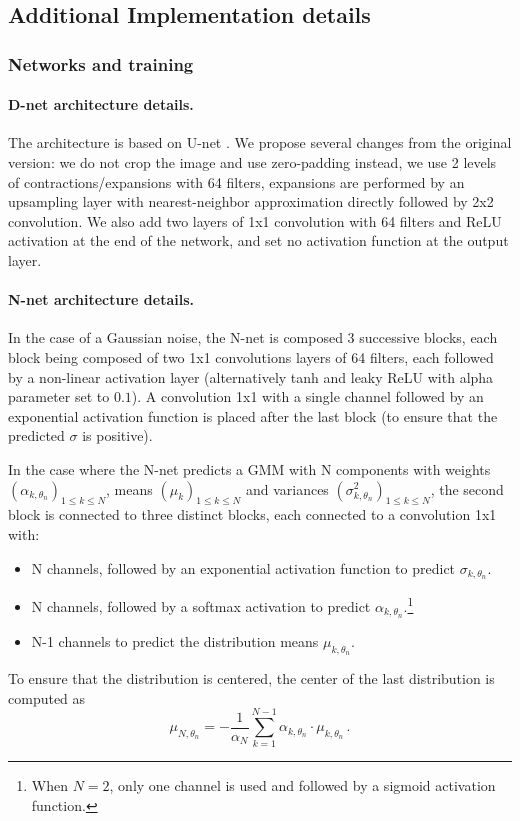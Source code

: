 \documentclass{article}
\begin{document}
\subsection{Additional Implementation details}
\label{si:implementation}
\subsubsection{Networks and training}
\paragraph{D-net architecture details.}
The architecture is based on U-net \cite{ronneberger2015u}.
We propose several changes from the original version: we do not crop the image and use zero-padding instead, we use 2 levels of contractions/expansions with 64 filters, expansions are performed by an upsampling layer with nearest-neighbor approximation directly followed by 2x2 convolution.
We also add two layers of 1x1 convolution with 64 filters and ReLU activation at the end of the network, and set no activation function at the output layer.

\paragraph{N-net architecture details.}
In the case of a Gaussian noise, the N-net is composed 3 successive blocks, each block being composed of two 1x1 convolutions layers of 64 filters, each followed by a non-linear activation layer (alternatively tanh and leaky ReLU with alpha parameter set to $0.1$). A convolution 1x1 with a single channel followed by an exponential activation function is placed after the last block (to ensure that the predicted $\sigma$ is positive).

In the case where the N-net predicts a GMM with N components with weights $(\alpha_{k,\theta_n})_{1\leqslant k\leqslant N}$, means $(\mu_k)_{1\leqslant k\leqslant N}$ and variances $(\sigma^2_{k,\theta_n})_{1\leqslant k\leqslant N}$, the second block is connected to three distinct blocks, each connected to a convolution 1x1 with:
\begin{itemize}
  \item N channels, followed by an exponential activation function to predict $\sigma_{k,\theta_n}$.
  \item N channels, followed by a softmax activation to predict $\alpha_{k,\theta_n}.$\footnote{When $N=2$, only one channel is used and followed by a sigmoid activation function.}
  \item N-1 channels to predict the distribution means $\mu_{k,\theta_n}$.
\end{itemize}
To ensure that the distribution is centered, the center of the last distribution is computed as
$$
\mu_{N,\theta_n} = - \frac{1}{\alpha_{N}} \sum_{k=1}^{N-1}\alpha_{k,\theta_n}\cdot\mu_{k,\theta_n}\,.
$$
\end{document}
